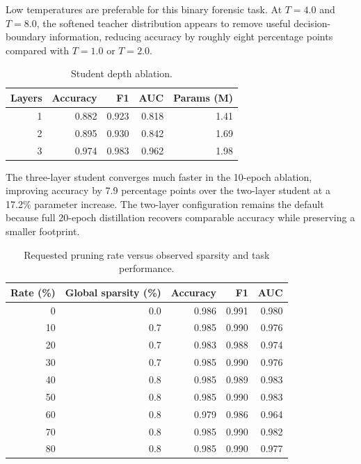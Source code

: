 \documentclass[pdflatex,sn-basic,Numbered]{sn-jnl}
\begin{document}
Low temperatures are preferable for this binary forensic task. At $T=4.0$ and $T=8.0$, the softened teacher distribution appears to remove useful decision-boundary information, reducing accuracy by roughly eight percentage points compared with $T=1.0$ or $T=2.0$.

\begin{table}[t]
\caption{Student depth ablation.}\label{tab:depth}
\centering
\scriptsize
\setlength{\tabcolsep}{7pt}
\begin{tabular}{rrrrr}
\toprule
Layers & Accuracy & F1 & AUC & Params (M) \\
\midrule
1 & 0.882 & 0.923 & 0.818 & 1.41 \\
2 & 0.895 & 0.930 & 0.842 & 1.69 \\
3 & 0.974 & 0.983 & 0.962 & 1.98 \\
\bottomrule
\end{tabular}
\end{table}

The three-layer student converges much faster in the 10-epoch ablation, improving accuracy by 7.9 percentage points over the two-layer student at a 17.2\% parameter increase. The two-layer configuration remains the default because full 20-epoch distillation recovers comparable accuracy while preserving a smaller footprint.

\begin{table}[t]
\caption{Requested pruning rate versus observed sparsity and task performance.}\label{tab:pruning-rate}
\centering
\scriptsize
\setlength{\tabcolsep}{5pt}
\begin{tabular}{rrrrr}
\toprule
Rate (\%) & Global sparsity (\%) & Accuracy & F1 & AUC \\
\midrule
0 & 0.0 & 0.986 & 0.991 & 0.980 \\
10 & 0.7 & 0.985 & 0.990 & 0.976 \\
20 & 0.7 & 0.983 & 0.988 & 0.974 \\
30 & 0.7 & 0.985 & 0.990 & 0.976 \\
40 & 0.8 & 0.985 & 0.989 & 0.983 \\
50 & 0.8 & 0.985 & 0.990 & 0.983 \\
60 & 0.8 & 0.979 & 0.986 & 0.964 \\
70 & 0.8 & 0.985 & 0.990 & 0.982 \\
80 & 0.8 & 0.985 & 0.990 & 0.977 \\
\bottomrule
\end{tabular}
\end{table}
\end{document}
